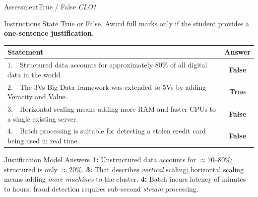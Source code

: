 \documentclass[aspectratio=169,10pt]{beamer}
\begin{document}
\begin{frame}{Assessment\textemdash True / False \hfill\small\textit{CLO1}}
  \begin{block}{Instructions}
    State True or False.  Award full marks only if the student provides a \textbf{one-sentence justification}.
  \end{block}
  \vspace{6pt}
  \centering
  \renewcommand{\arraystretch}{1.55}
  \begin{tabular}{p{9.0cm}c}
    \toprule
    \textbf{Statement} & \textbf{Answer} \\
    \midrule
    1.\ \ Structured data accounts for approximately 80\% of all digital data in the world. & \alert{\textbf{False}} \\
    2.\ \ The 3Vs Big Data framework was extended to 5Vs by adding Veracity and Value. & \textbf{True} \\
    3.\ \ Horizontal scaling means adding more RAM and faster CPUs to a single existing server. & \alert{\textbf{False}} \\
    4.\ \ Batch processing is suitable for detecting a stolen credit card being used in real time. & \alert{\textbf{False}} \\
    \bottomrule
  \end{tabular}
  \vspace{8pt}
  \begin{exampleblock}{Justification Model Answers}
    \small \textbf{1:} Unstructured data accounts for $\approx$70--80\%; structured is only $\approx$20\%.  \textbf{3:} That describes \emph{vertical} scaling; horizontal scaling means adding \emph{more machines} to the cluster.  \textbf{4:} Batch incurs latency of minutes to hours; fraud detection requires sub-second \emph{stream} processing.
  \end{exampleblock}
\end{frame}
\end{document}
